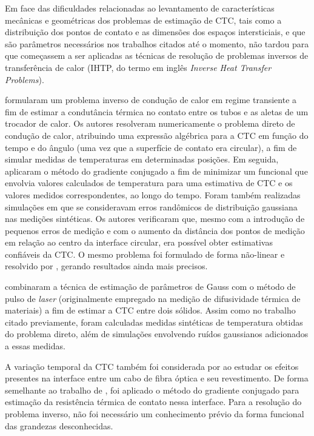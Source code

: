 Em face das dificuldades relacionadas ao levantamento de características mecânicas e geométricas dos problemas de estimação de CTC, 
tais como a distribuição dos pontos de contato e as dimensões dos espaços intersticiais, e que são parâmetros necessários nos trabalhos citados
até o momento, não tardou para que começassem a ser aplicadas as técnicas de resolução de problemas inversos de transferência de calor (IHTP, do termo em inglês \textit{Inverse Heat Transfer Problems}).

\cite{artigo_huang} formularam um problema inverso de condução de calor em regime transiente a fim de estimar a condutância térmica no contato entre
os tubos e as aletas de um trocador de calor. Os autores resolveram numericamente o problema direto de condução de calor, atribuindo uma expressão
algébrica para a CTC em função do tempo e do ângulo (uma vez que a superfície de contato era circular), a fim de simular medidas de temperaturas
em determinadas posições. Em seguida, aplicaram o método do gradiente conjugado a fim de minimizar um funcional que envolvia valores calculados
de temperatura para uma estimativa de CTC e os valores medidos correspondentes, ao longo do tempo. Foram também realizadas simulações em que se
consideravam erros randômicos de distribuição gaussiana nas medições sintéticas. Os autores verificaram que, mesmo com a introdução de pequenos erros de medição e com
o aumento da distância dos pontos de medição em relação ao centro da interface circular, era possível obter estimativas confiáveis da CTC. O mesmo
problema foi formulado de forma não-linear e resolvido por \cite{artigo_huang_2}, gerando resultados ainda mais precisos.

\cite{artigo_milosevic} combinaram a técnica de estimação de parâmetros de Gauss com o método de pulso de \textit{laser} (originalmente empregado
na medição de difusividade térmica de materiais) a fim de estimar a CTC entre dois sólidos. Assim como no trabalho citado previamente, foram calculadas
medidas sintéticas de temperatura obtidas do problema direto, além de simulações envolvendo ruídos gaussianos adicionados a essas medidas.

A variação temporal da CTC também foi considerada por \cite{artigo_yang} ao estudar os efeitos presentes na interface entre um cabo de
fibra óptica e seu revestimento. De forma semelhante ao trabalho de \cite{artigo_huang}, foi aplicado o método do gradiente conjugado para estimação
da resistência térmica de contato nessa interface. Para a resolução do problema inverso, não foi necessário um conhecimento prévio da forma funcional das grandezas desconhecidas.

